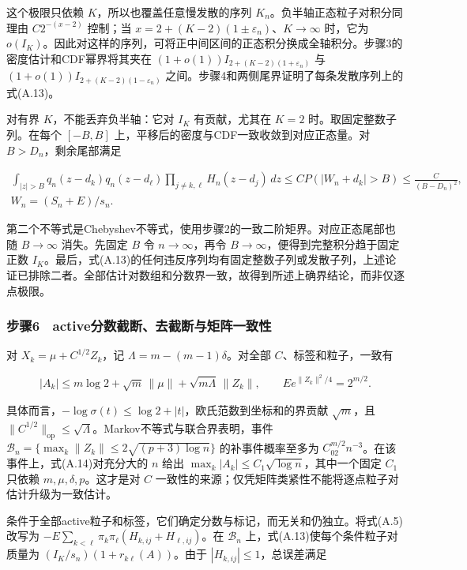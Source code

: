 \documentclass[11pt,a4paper]{article}
\begin{document}
这个极限只依赖 \(K\)，所以也覆盖任意慢发散的序列
\(K_n\)。负半轴正态粒子对积分同理由 \(C2^{-(x-2)}\) 控制；当
\(x=2+(K-2)(1\pm\varepsilon_n)\)、\(K\to\infty\) 时，它为
\(o(I_K)\)。因此对这样的序列，可将正中间区间的正态积分换成全轴积分。步骤3的密度估计和CDF幂界将其夹在
\((1+o(1))I_{2+(K-2)(1+\varepsilon_n)}\) 与
\((1+o(1))I_{2+(K-2)(1-\varepsilon_n)}\)
之间。步骤4和两侧尾界证明了每条发散序列上的式(A.13)。

对有界 \(K\)，不能丢弃负半轴：它对 \(I_K\) 有贡献，尤其在 \(K=2\)
时。取固定整数子列。在每个 \([-B,B]\)
上，平移后的密度与CDF一致收敛到对应正态量。对 \(B>D_n\)，剩余尾部满足

\[
\begin{gathered}
\int_{|z|>B}q_n(z-d_k)q_n(z-d_\ell)
\prod_{j\ne k,\ell}H_n(z-d_j)\,dz
\le C P(|W_n+d_k|>B)\le\frac{C}{(B-D_n)^2},\\
W_n=(S_n+E)/s_n.
\end{gathered}
\]

第二个不等式是Chebyshev不等式，使用步骤2的一致二阶矩界。对应正态尾部也随
\(B\to\infty\) 消失。先固定 \(B\) 令 \(n\to\infty\)，再令
\(B\to\infty\)，便得到完整积分趋于固定正数
\(I_K\)。最后，式(A.13)的任何违反序列均有固定整数子列或发散子列，上述论证已排除二者。全部估计对数组和分数界一致，故得到所述上确界结论，而非仅逐点极限。

\subsubsection*{步骤6　active分数截断、去截断与矩阵一致性}\label{ux6b65ux9aa46-activeux5206ux6570ux622aux65adux53bbux622aux65adux4e0eux77e9ux9635ux4e00ux81f4ux6027}

对 \(X_k=\mu+C^{1/2}Z_k\)，记 \(\Lambda=m-(m-1)\delta\)。对全部
\(C\)、标签和粒子，一致有

\[
|A_k|\le m\log2+\sqrt m\,\|\mu\|+\sqrt{m\Lambda}\,\|Z_k\|,
\qquad E e^{\|Z_k\|^2/4}=2^{m/2}.
\tag{A.14}
\]

具体而言，\(-\log\sigma(t)\le\log2+|t|\)，欧氏范数到坐标和的界贡献
\(\sqrt m\)，且
\(\|C^{1/2}\|_{\mathrm{op}}\le\sqrt\Lambda\)。Markov不等式与联合界表明，事件
\(\mathcal B_n=\{\max_k\|Z_k\|\le2\sqrt{(p+3)\log n}\}\)
的补事件概率至多为 \(C_02^{m/2}n^{-3}\)。在该事件上，式(A.14)对充分大的
\(n\) 给出 \(\max_k|A_k|\le C_1\sqrt{\log n}\)，其中一个固定 \(C_1\)
只依赖 \(m,\mu,\delta,p\)。这才是对 \(C\)
一致性的来源；仅凭矩阵类紧性不能将逐点粒子对估计升级为一致估计。

条件于全部active粒子和标签，它们确定分数与标记，而无关和仍独立。将式(A.5)改写为
\(-E\sum_{k<\ell}\pi_k\pi_\ell(H_{k,ij}+H_{\ell,ij})\)。在
\(\mathcal B_n\) 上，式(A.13)使每个条件粒子对质量为
\((I_K/s_n)(1+r_{k\ell}(A))\)。由于 \(|H_{k,ij}|\le1\)，总误差满足
\end{document}

